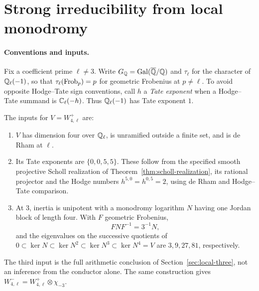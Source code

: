 \section{Strong irreducibility from local monodromy}\label{sec:irreducibility}
\paragraph{Conventions and inputs.}
Fix a coefficient prime $\ell\ne3$. Write $G_\mathbb Q=\operatorname{Gal}(\overline{\mathbb Q}/\mathbb Q)$ and
$\tau_\ell$ for the character of $\mathbb Q_\ell(-1)$, so that
$\tau_\ell(\operatorname{Frob}_p)=p$ for geometric Frobenius at $p\ne\ell$.
To avoid opposite Hodge--Tate sign conventions, call $h$ a \emph{Tate
exponent} when a Hodge--Tate summand is $\mathbb C_\ell(-h)$.
Thus $\mathbb Q_\ell(-1)$ has Tate exponent $1$.

The inputs for $V=W_{4,\ell}^+$ are:
\begin{enumerate}
\item $V$ has dimension four over $\mathbb Q_\ell$, is unramified outside a finite
set, and is de Rham at $\ell$.
\item Its Tate exponents are $\{0,0,5,5\}$. These follow from the specified
smooth projective Scholl realization of
Theorem~\ref{thm:scholl-realization}, its rational projector and the Hodge
numbers $h^{5,0}=h^{0,5}=2$, using de Rham and Hodge--Tate comparison.
\item At $3$, inertia is unipotent with a monodromy logarithm $N$ having
one Jordan block of length four. With $F$ geometric Frobenius,
\[
 FNF^{-1}=3^{-1}N,
\]
and the eigenvalues on the successive quotients of
$0\subset\ker N\subset\ker N^2\subset\ker N^3\subset\ker N^4=V$
are $3,9,27,81$, respectively.
\end{enumerate}
The third input is the full arithmetic conclusion of
Section~\ref{sec:local-three}, not an inference from the conductor alone. The same construction gives
$W_{4,\ell}^-=W_{4,\ell}^+\otimes\chi_{-3}$.

